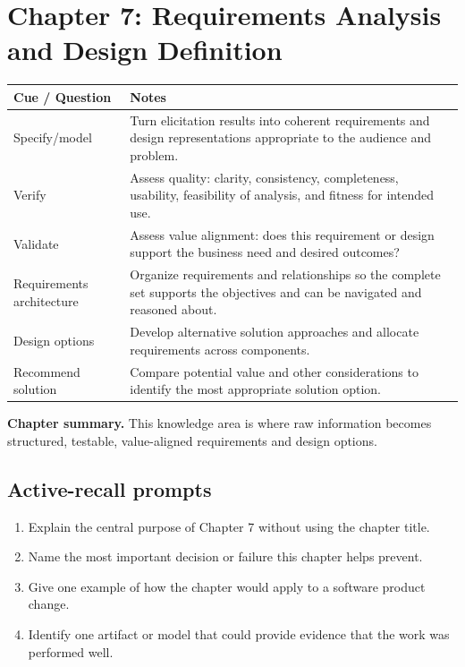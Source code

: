 \documentclass[11pt]{article}
\begin{document}
\section{Chapter 7: Requirements Analysis and Design Definition}
\begin{longtable}{L{0.26\textwidth} L{0.64\textwidth}}
\toprule
\textbf{Cue / Question} & \textbf{Notes}\\
\midrule
\endhead
Specify/model & Turn elicitation results into coherent requirements and design representations appropriate to the audience and problem.\\
Verify & Assess quality: clarity, consistency, completeness, usability, feasibility of analysis, and fitness for intended use.\\
Validate & Assess value alignment: does this requirement or design support the business need and desired outcomes?\\
Requirements architecture & Organize requirements and relationships so the complete set supports the objectives and can be navigated and reasoned about.\\
Design options & Develop alternative solution approaches and allocate requirements across components.\\
Recommend solution & Compare potential value and other considerations to identify the most appropriate solution option.\\
\bottomrule
\end{longtable}
\begin{keybox}\textbf{Chapter summary.} This knowledge area is where raw information becomes structured, testable, value-aligned requirements and design options.\end{keybox}
\subsection*{Active-recall prompts}
\begin{enumerate}
\item Explain the central purpose of Chapter 7 without using the chapter title.
\item Name the most important decision or failure this chapter helps prevent.
\item Give one example of how the chapter would apply to a software product change.
\item Identify one artifact or model that could provide evidence that the work was performed well.
\end{enumerate}
\end{document}
